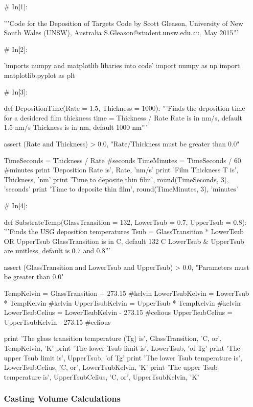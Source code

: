 \documentclass[a4paper,8pt]{article}
\begin{document}
\begin{python}
# In[1]:

'''Code for the Deposition of Targets
Code by Scott Gleason, University of New South Wales (UNSW), Australia 
S.Gleason@student.unsw.edu.au, May 2015'''


# In[2]:

'imports numpy and matplotlib libaries into code'
import numpy as np
import matplotlib.pyplot as plt


# In[3]:

def DepositionTime(Rate = 1.5, Thickness = 1000):
'''Finds the deposition time for a desidered film thickness 
time = Thickness / Rate
Rate is in nm/s, default 1.5 nm/s
Thickness is in nm, default 1000 nm'''

assert (Rate and Thickness) > 0.0, "Rate/Thickness must be greater than 0.0"

TimeSeconds = Thickness / Rate #seconds
TimeMinutes = TimeSeconds / 60. #minutes
print 'Deposition Rate is', Rate, 'nm/s'
print 'Film Thickness T is', Thickness, 'nm'
print 'Time to deposite thin film', round(TimeSeconds, 3), 'seconds'
print 'Time to deposite thin film', round(TimeMinutes, 3), 'minutes'


# In[4]:

def SubstrateTemp(GlassTransition = 132, LowerTsub = 0.7, UpperTsub = 0.8):
'''Finds the USG deposition temperatures 
Tsub = GlassTransition * LowerTsub OR UpperTsub
GlassTransition is in C, default 132 C
LowerTsub & UpperTsub are unitless, default is 0.7 and 0.8'''

assert (GlassTransition and LowerTsub and UpperTsub) > 0.0, "Parameters must be greater than 0.0"

TempKelvin = GlassTransition + 273.15 #kelvin
LowerTsubKelvin = LowerTsub * TempKelvin #kelvin
UpperTsubKelvin = UpperTsub * TempKelvin #kelvin
LowerTsubCelius = LowerTsubKelvin - 273.15 #celious
UpperTsubCelius = UpperTsubKelvin - 273.15 #celious

print 'The glass transition temperature (Tg) is', GlassTransition, 'C,  or', TempKelvin, 'K'
print 'The lower Tsub limit is', LowerTsub, 'of Tg'
print 'The upper Tsub limit is', UpperTsub, 'of Tg'
print 'The lower Tsub temperature is', LowerTsubCelius, 'C,  or', LowerTsubKelvin, 'K'
print 'The upper Tsub temperature is', UpperTsubCelius, 'C,  or', UpperTsubKelvin, 'K'

\end{python}

\newpage
\subsubsection{Casting Volume Calculations}
\end{document}
